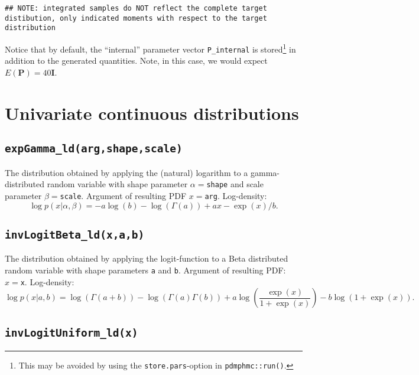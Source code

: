 \documentclass[
]{book}
\begin{document}
\begin{verbatim}
## NOTE: integrated samples do NOT reflect the complete target distibution, only indicated moments with respect to the target distribution
\end{verbatim}

Notice that by default, the ``internal'' parameter vector \texttt{P\_internal} is stored\footnote{This may be avoided by using the \texttt{store.pars}-option in \texttt{pdmphmc::run()}.} in addition to the generated quantities. Note, in this case, we would expect \(E(\mathbf P)=40 \mathbf I\).

\hypertarget{univariate-continuous-distributions}{%
\section{Univariate continuous distributions}\label{univariate-continuous-distributions}}

\hypertarget{expgamma_ldargshapescale}{%
\subsection{\texorpdfstring{\texttt{expGamma\_ld(arg,shape,scale)}}{expGamma\_ld(arg,shape,scale)}}\label{expgamma_ldargshapescale}}

The distribution obtained by applying the (natural) logarithm to a gamma-distributed random variable with shape parameter \(\alpha=\)\texttt{shape} and scale parameter \(\beta=\)\texttt{scale}. Argument of resulting PDF \(x=\)\texttt{arg}. Log-density:
\[
\log p(x|\alpha,\beta) = -a\log(b) - \log(\Gamma(a)) + ax - \exp(x)/b.
\]

\hypertarget{invlogitbeta_ldxab}{%
\subsection{\texorpdfstring{\texttt{invLogitBeta\_ld(x,a,b)}}{invLogitBeta\_ld(x,a,b)}}\label{invlogitbeta_ldxab}}

The distribution obtained by applying the logit-function to a Beta distributed random variable with shape parameters \texttt{a} and \texttt{b}. Argument of resulting PDF: \(x=\)\texttt{x}. Log-density:
\[
\log p(x|a,b) = \log(\Gamma(a+b)) - \log(\Gamma(a)\Gamma(b)) + a\log\left(\frac{\exp(x)}{1+\exp(x)}\right) - b\log(1+\exp(x)).
\]

\hypertarget{invlogituniform_ldx}{%
\subsection{\texorpdfstring{\texttt{invLogitUniform\_ld(x)}}{invLogitUniform\_ld(x)}}\label{invlogituniform_ldx}}
\end{document}
